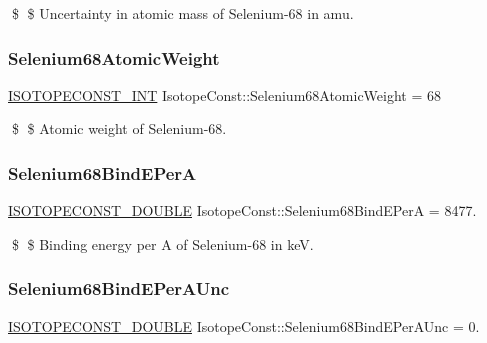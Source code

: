 \$ \$ Uncertainty in atomic mass of Selenium-\/68 in amu. \mbox{\label{group___isotope_const-_selenium-_se68_ga8e6daba64122f44c349fda91a86e2efa}} 
\subsubsection{\texorpdfstring{Selenium68\+Atomic\+Weight}{Selenium68AtomicWeight}}
{\footnotesize\ttfamily \mbox{\hyperlink{group___isotope_const-_macros_ga5f18360b3e99483a35c32d789e62621c}{I\+S\+O\+T\+O\+P\+E\+C\+O\+N\+S\+T\+\_\+\+I\+NT}} Isotope\+Const\+::\+Selenium68\+Atomic\+Weight = 68}

\$ \$ Atomic weight of Selenium-\/68. \mbox{\label{group___isotope_const-_selenium-_se68_ga319de709d101381d836f92fc857708a2}} 
\subsubsection{\texorpdfstring{Selenium68\+Bind\+E\+PerA}{Selenium68BindEPerA}}
{\footnotesize\ttfamily \mbox{\hyperlink{group___isotope_const-_macros_ga8f45a7272ce02c0b4c65c44636ed719a}{I\+S\+O\+T\+O\+P\+E\+C\+O\+N\+S\+T\+\_\+\+D\+O\+U\+B\+LE}} Isotope\+Const\+::\+Selenium68\+Bind\+E\+PerA = 8477.}

\$ \$ Binding energy per A of Selenium-\/68 in keV. \mbox{\label{group___isotope_const-_selenium-_se68_ga06c58c6c95cd8fc5ceeaf04849722ae3}} 
\subsubsection{\texorpdfstring{Selenium68\+Bind\+E\+Per\+A\+Unc}{Selenium68BindEPerAUnc}}
{\footnotesize\ttfamily \mbox{\hyperlink{group___isotope_const-_macros_ga8f45a7272ce02c0b4c65c44636ed719a}{I\+S\+O\+T\+O\+P\+E\+C\+O\+N\+S\+T\+\_\+\+D\+O\+U\+B\+LE}} Isotope\+Const\+::\+Selenium68\+Bind\+E\+Per\+A\+Unc = 0.}

